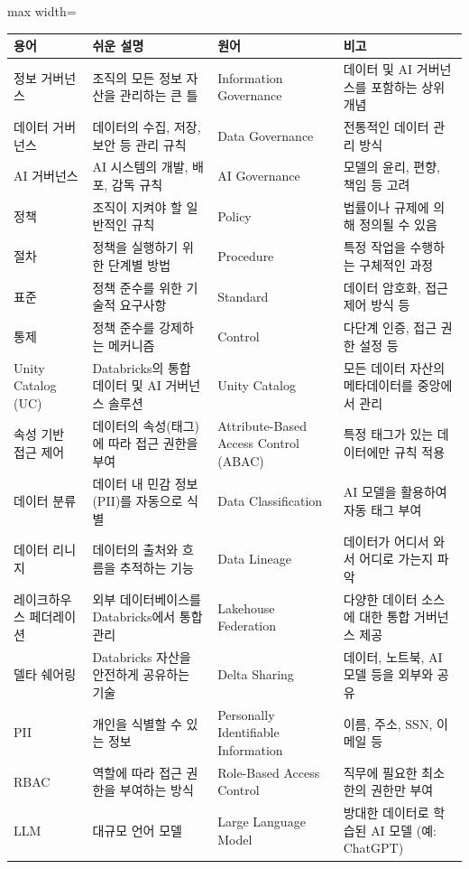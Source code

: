 \documentclass[11pt,a4paper]{article}
\begin{document}
\begin{adjustbox}{max width=\textwidth}
\begin{tabular}{llll}
\toprule
\textbf{용어} & \textbf{쉬운 설명} & \textbf{원어} & \textbf{비고} \\
\midrule
정보 거버넌스 & 조직의 모든 정보 자산을 관리하는 큰 틀 & Information Governance & 데이터 및 AI 거버넌스를 포함하는 상위 개념 \\
데이터 거버넌스 & 데이터의 수집, 저장, 보안 등 관리 규칙 & Data Governance & 전통적인 데이터 관리 방식 \\
AI 거버넌스 & AI 시스템의 개발, 배포, 감독 규칙 & AI Governance & 모델의 윤리, 편향, 책임 등 고려 \\
정책 & 조직이 지켜야 할 일반적인 규칙 & Policy & 법률이나 규제에 의해 정의될 수 있음 \\
절차 & 정책을 실행하기 위한 단계별 방법 & Procedure & 특정 작업을 수행하는 구체적인 과정 \\
표준 & 정책 준수를 위한 기술적 요구사항 & Standard & 데이터 암호화, 접근 제어 방식 등 \\
통제 & 정책 준수를 강제하는 메커니즘 & Control & 다단계 인증, 접근 권한 설정 등 \\
Unity Catalog (UC) & Databricks의 통합 데이터 및 AI 거버넌스 솔루션 & Unity Catalog & 모든 데이터 자산의 메타데이터를 중앙에서 관리 \\
속성 기반 접근 제어 & 데이터의 속성(태그)에 따라 접근 권한을 부여 & Attribute-Based Access Control (ABAC) & 특정 태그가 있는 데이터에만 규칙 적용 \\
데이터 분류 & 데이터 내 민감 정보(PII)를 자동으로 식별 & Data Classification & AI 모델을 활용하여 자동 태그 부여 \\
데이터 리니지 & 데이터의 출처와 흐름을 추적하는 기능 & Data Lineage & 데이터가 어디서 와서 어디로 가는지 파악 \\
레이크하우스 페더레이션 & 외부 데이터베이스를 Databricks에서 통합 관리 & Lakehouse Federation & 다양한 데이터 소스에 대한 통합 거버넌스 제공 \\
델타 쉐어링 & Databricks 자산을 안전하게 공유하는 기술 & Delta Sharing & 데이터, 노트북, AI 모델 등을 외부와 공유 \\
PII & 개인을 식별할 수 있는 정보 & Personally Identifiable Information & 이름, 주소, SSN, 이메일 등 \\
RBAC & 역할에 따라 접근 권한을 부여하는 방식 & Role-Based Access Control & 직무에 필요한 최소한의 권한만 부여 \\
LLM & 대규모 언어 모델 & Large Language Model & 방대한 데이터로 학습된 AI 모델 (예: ChatGPT) \\
\bottomrule
\end{tabular}
\end{adjustbox}
\label{tab:glossary}
\end{document}
